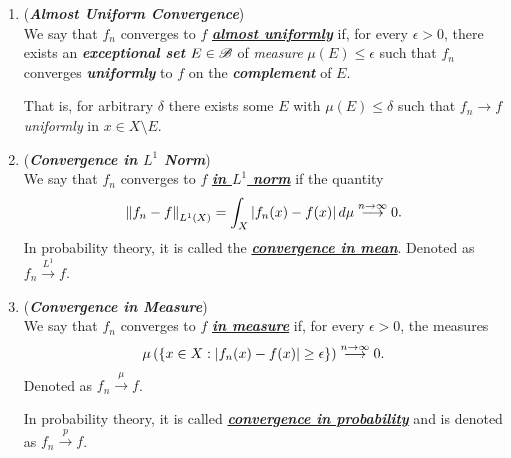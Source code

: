 \documentclass[11pt]{article}
\begin{document}
\begin{itemize}
\begin{remark}
\begin{enumerate}
\item \begin{definition}  (\emph{\textbf{Almost Uniform Convergence}})  \citep{tao2011introduction}\\
We say that $f_n$ converges to $f$ \underline{\emph{\textbf{almost uniformly}}} if, for every $\epsilon > 0$, there exists an \emph{\textbf{exceptional set}} $E \in {\mathscr B}$ of \emph{measure} $\mu(E) \le \epsilon$ such that $f_n$ converges \emph{\textbf{uniformly}} to $f$ on the \emph{\textbf{complement}} of $E$.

That is, for arbitrary $\delta$ there exists some $E$ with $\mu(E) \le \delta$ such that $f_n \rightarrow f$ \emph{uniformly} in $x \in X \setminus E$.
\end{definition} 

\item \begin{definition} (\emph{\textbf{Convergence in $L^{1}$ Norm}})\\
We say that $f_n$ converges to $f$  \underline{\emph{\textbf{in $L^1$ norm}}} if the quantity 
\begin{align*}
\left\|f_n - f\right\|_{L^{1}(X)} =  \int_{X}\left\lvert  f_n(x) - f(x) \right\rvert d\mu  \stackrel{n\rightarrow \infty}{\longrightarrow} 0.
\end{align*} In probability theory, it is called the \underline{\emph{\textbf{convergence in mean}}}. Denoted as $f_{n}\stackrel{L^{1}}{\rightarrow} f$.
\end{definition} 

\item  \begin{definition} (\emph{\textbf{Convergence in Measure}})\\
We say that $f_n$ converges to $f$  \underline{\emph{\textbf{in measure}}} if, for every $\epsilon> 0$,  the measures
\begin{align*}
\mu\left( \left\{x \in X: \left\lvert f_n(x) - f(x) \right\rvert \ge \epsilon\right\}\right)\stackrel{n\rightarrow \infty}{\longrightarrow} 0.
\end{align*} Denoted as $f_{n}\stackrel{\mu}{\rightarrow} f$.

In probability theory, it is called \underline{\emph{\textbf{convergence in probability}}} and is denoted as $f_n \stackrel{p}{\rightarrow} f$.
\end{definition} 
\end{enumerate}
\end{remark}
\end{itemize}
\end{document}
